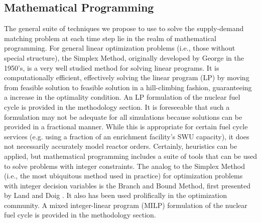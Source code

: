 \subsection{Mathematical Programming}

The general suite of techniques we propose to use to solve the supply-demand
matching problem at each time step lie in the realm of mathematical
programming. For general linear optimization problems (i.e., those without
special structure), the Simplex Method, originally developed by
George \cite{dantzig_generalized_1955} in the 1950's, is a very well studied
method for solving linear programs. It is computationally efficient, effectively
solving the linear program (LP) by moving from feasible solution to feasible
solution in a hill-climbing fashion, guaranteeing a increase in the optimality
condition. An LP formulation of the nuclear fuel cycle is provided in the
methodology section. It is foreseeable that such a formulation may not be adequate
for all simulations because solutions can be provided in a fractional
manner. While this is appropriate for certain fuel cycle services (e.g. using a
fraction of an enrichment facility's SWU capacity), it does not necessarily
accurately model reactor orders. Certainly, heuristics can be applied, but
mathematical programming includes a suite of tools that can be used to solve
problems with integer constraints. The analog to the Simplex Method (i.e., the
most ubiquitous method used in practice) for optimization problems with integer
decision variables is the Branch and Bound Method, first presented by Land and
Doig \cite{land_automatic_1960}. It also has been used prolifically in the
optimization community. A mixed integer-linear program (MILP) formulation of the
nuclear fuel cycle is provided in the methodology section.
